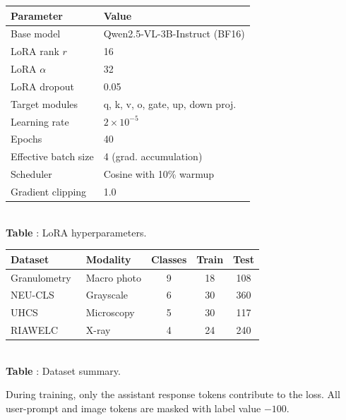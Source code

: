 \documentclass{bmvc2k}
\begin{document}
\begin{table}[t]
\scriptsize
\centering
\begin{minipage}[t]{0.44\textwidth}
\centering
\vspace{0pt}
\label{tab:hyperparams}
\begin{tabular}{ll}
\toprule
Parameter & Value \\
\midrule
Base model & Qwen2.5-VL-3B-Instruct (BF16) \\
LoRA rank $r$ & 16 \\
LoRA $\alpha$ & 32 \\
LoRA dropout & 0.05 \\
Target modules & q, k, v, o, gate, up, down proj. \\
Learning rate & $2 \times 10^{-5}$ \\
Epochs & 40 \\
Effective batch size & 4 (grad. accumulation) \\
Scheduler & Cosine with 10\% warmup \\
Gradient clipping & 1.0 \\
\bottomrule
\end{tabular}\\[4pt]
{\small\textcolor{bmv@captioncolor}{\textbf{Table }: LoRA hyperparameters.}}
\end{minipage}%
\hfill
\begin{minipage}[t]{0.50\textwidth}
\centering
\vspace{0pt}
\label{tab:datasets}
\begin{tabular}{llccc}
\toprule
Dataset & Modality & Classes & Train & Test \\
\midrule
Granulometry~\cite{coenen2022learning} & Macro photo & 9 & 18 & 108 \\
NEU-CLS~\cite{song2013noise} & Grayscale & 6 & 30 & 360 \\
UHCS~\cite{decost2019high} & Microscopy & 5 & 30 & 117 \\
RIAWELC~\cite{totino2022riawelc} & X-ray & 4 & 24 & 240 \\
\bottomrule
\end{tabular}\\[4pt]
{\small\textcolor{bmv@captioncolor}{\textbf{Table }: Dataset summary.}}
\end{minipage}
\end{table}

During training, only the assistant response tokens contribute to the loss. All user-prompt and image tokens are masked with label value $-100$.
\end{document}
